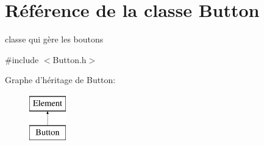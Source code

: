 \hypertarget{classButton}{
\section{Référence de la classe Button}
\label{classButton}
}


classe qui gère les boutons  




{\ttfamily \#include $<$Button.h$>$}

Graphe d'héritage de Button:\begin{figure}[H]
\begin{center}
\leavevmode
\includegraphics[height=2.000000cm]{classButton}
\end{center}
\end{figure}
